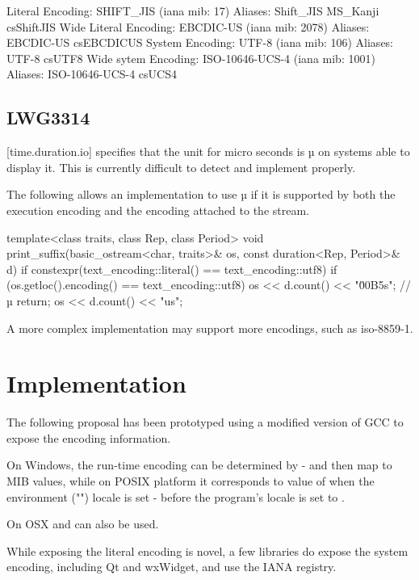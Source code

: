 \documentclass{wg21}
\begin{document}
\begin{codeblock}
Literal Encoding: SHIFT_JIS (iana mib: 17)
Aliases:
	Shift_JIS
	MS_Kanji
	csShiftJIS
Wide Literal Encoding: EBCDIC-US (iana mib: 2078)
Aliases:
	EBCDIC-US
	csEBCDICUS
System Encoding: UTF-8 (iana mib: 106)
Aliases:
	UTF-8
	csUTF8
Wide sytem Encoding: ISO-10646-UCS-4 (iana mib: 1001)
Aliases:
	ISO-10646-UCS-4
	csUCS4
\end{codeblock}

\subsection{LWG3314}

[time.duration.io] specifies that the unit for micro seconds is µ on systems able to display it.
This is currently difficult to detect and implement properly.

The following allows an implementation to use µ if it is supported by both the execution encoding and the encoding
attached to the stream.


\begin{codeblock}
template<class traits, class Rep, class Period>
void print_suffix(basic_ostream<char, traits>& os, const duration<Rep, Period>& d)
{
	if constexpr(text_encoding::literal() == text_encoding::utf8) {
		if (os.getloc().encoding() == text_encoding::utf8) {
			os << d.count() << "\u00B5s"; // µ
			return;
		}
	}
	os << d.count() << "us";
}
\end{codeblock}

A more complex implementation may support more encodings, such as iso-8859-1.

\section{Implementation}

The following proposal has been prototyped using a modified version of GCC to expose the encoding information.

On Windows, the run-time encoding can be determined by  - and then map to MIB values, while on POSIX platform it corresponds to value of  when the environment ("") locale is set - before the program's locale is set to .

On OSX  and  can also be used.


While exposing the literal encoding is novel, a few libraries do expose the system encoding, including Qt and wxWidget, and use the IANA registry.
\end{document}
